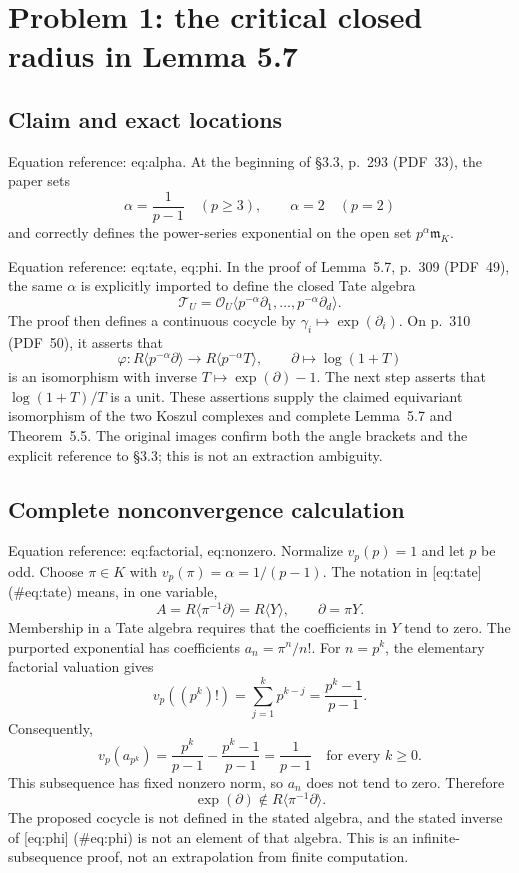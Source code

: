 \documentclass[10pt]{article}
\begin{document}
\section*{Problem 1: the critical closed radius in Lemma 5.7}
\subsection*{Claim and exact locations}
Equation reference: eq:alpha. At the beginning of §3.3, p. 293 (PDF 33), the paper sets \[
 \alpha=\frac{1}{p-1}\quad(p\geq3),\qquad \alpha=2\quad(p=2)\] and correctly defines the power-series exponential on the open set \(p^\alpha\mathfrak m_K\).\par
Equation reference: eq:tate, eq:phi. In the proof of Lemma 5.7, p. 309 (PDF 49), the same \(\alpha\) is explicitly imported to define the closed Tate algebra \[
 \mathcal T_U=\mathcal O_U\langle p^{-\alpha}\partial_1,\ldots,p^{-\alpha}\partial_d\rangle.\] The proof then defines a continuous cocycle by \(\gamma_i\mapsto\exp(\partial_i)\). On p. 310 (PDF 50), it asserts that \[
 \varphi:R\langle p^{-\alpha}\partial\rangle
 \longrightarrow R\langle p^{-\alpha}T\rangle,\qquad
 \partial\longmapsto\log(1+T)\] is an isomorphism with inverse \(T\mapsto\exp(\partial)-1\). The next step asserts that \(\log(1+T)/T\) is a unit. These assertions supply the claimed equivariant isomorphism of the two Koszul complexes and complete Lemma 5.7 and Theorem 5.5. The original images confirm both the angle brackets and the explicit reference to §3.3; this is not an extraction ambiguity.\par
\subsection*{Complete nonconvergence calculation}
Equation reference: eq:factorial, eq:nonzero. Normalize \(v_p(p)=1\) and let \(p\) be odd. Choose \(\pi\in K\) with \(v_p(\pi)=\alpha=1/(p-1)\). The notation in [eq:tate] (\#eq:tate) means, in one variable, \[A=R\langle\pi^{-1}\partial\rangle=R\langle Y\rangle,\qquad \partial=\pi Y.\] Membership in a Tate algebra requires that the coefficients in \(Y\) tend to zero. The purported exponential has coefficients \(a_n=\pi^n/n!\). For \(n=p^k\), the elementary factorial valuation gives \[
 v_p((p^k)!)=\sum_{j=1}^{k}p^{k-j}=\frac{p^k-1}{p-1}.\] Consequently, \[
 v_p(a_{p^k})=\frac{p^k}{p-1}-\frac{p^k-1}{p-1}
 =\frac1{p-1}
 \quad\text{for every }k\geq0.\] This subsequence has fixed nonzero norm, so \(a_n\) does not tend to zero. Therefore \[\exp(\partial)\notin R\langle\pi^{-1}\partial\rangle .\] The proposed cocycle is not defined in the stated algebra, and the stated inverse of [eq:phi] (\#eq:phi) is not an element of that algebra. This is an infinite-subsequence proof, not an extrapolation from finite computation.\par
\end{document}
